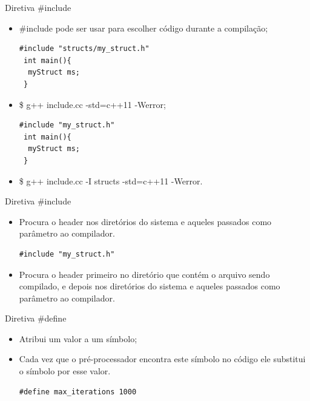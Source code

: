 \documentclass[12pt,table,xcolor={dvipsnames}]{beamer}
\begin{document}
\begin{frame}[fragile]{Diretiva \#include}
\begin{itemize}
\item \#include pode ser usar para escolher código durante a compilação;
\begin{lstlisting}
#include "structs/my_struct.h"
 int main(){
  myStruct ms;
 }
\end{lstlisting}
\item \$ g++ include.cc -std=c++11 -Werror;
\begin{lstlisting}
#include "my_struct.h"
 int main(){
  myStruct ms;
 }
\end{lstlisting}
\item \$ g++ include.cc -I structs -std=c++11 -Werror.
\end{itemize}
\end{frame}

\begin{frame}[fragile]{Diretiva \#include}
\begin{itemize}
\begin{lstlisting}
#include <list>
\end{lstlisting}
\item Procura o header nos diretórios do sistema e aqueles passados como parâmetro ao compilador.
\\
\begin{lstlisting}
#include "my_struct.h"
\end{lstlisting}
\item Procura o header primeiro no diretório que contém o arquivo sendo compilado, e depois nos diretórios do sistema e aqueles passados como parâmetro ao compilador.
\end{itemize}
\end{frame}

\begin{frame}[fragile]{Diretiva \#define}
\begin{itemize}
\item Atribui um valor a um símbolo;
\item Cada vez que o pré-processador encontra este símbolo no código ele substitui o símbolo por esse valor.
\begin{lstlisting}
#define max_iterations 1000
\end{lstlisting}
\end{itemize}
\end{frame}
\end{document}

